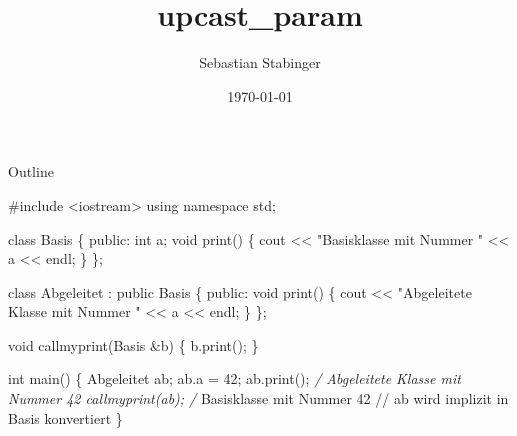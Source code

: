 \documentclass[presentation]{beamer}
\author{Sebastian Stabinger}
\date{\today}
\title{upcast\_param}
\begin{document}
\maketitle
\begin{frame}{Outline}
\tableofcontents
\end{frame}

\#include <iostream>
using namespace std;

class Basis \{
public:
  int a;
  void print() \{ cout << "Basisklasse mit Nummer " << a << endl; \}
\};

class Abgeleitet : public Basis \{
public:
  void print() \{ cout << "Abgeleitete Klasse mit Nummer " << a << endl; \}
\};

void callmyprint(Basis \&b) \{ b.print(); \}

int main() \{
  Abgeleitet ab;
  ab.a = 42;
  ab.print(); \emph{/ Abgeleitete Klasse mit Nummer 42
  callmyprint(ab); /} Basisklasse mit Nummer 42
  // ab wird implizit in Basis konvertiert
\}
\end{document}
